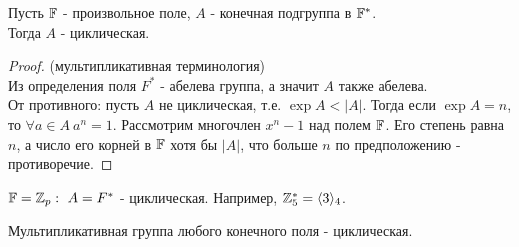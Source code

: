 \begin{theorem}
    Пусть $\mathbb{F}$ - произвольное поле, $A$ - конечная подгруппа в $\mathbb{F}^*$.\\
    Тогда $A$ - циклическая.
\end{theorem}
\begin{proof} (мультипликативная терминология)\\
    Из определения поля $F^*$ - абелева группа, а значит $A$ также абелева.\\
    От противного: пусть $A$ не циклическая, т.е. $\exp A < |A|$. Тогда если $\exp A = n$, то $\forall a \in A \ a^{n} = 1$. Рассмотрим многочлен $x^n - 1$ над полем $\mathbb{F}$. Его степень равна $n$, а число его корней в $\mathbb{F}$ хотя бы $|A|$, что больше $n$ по предположению - противоречие. 
\end{proof}
\begin{example}
    $\mathbb{F} = \mathbb{Z}_p: \ A = F^*$ - циклическая. Например, $\mathbb{Z}_5^* = \langle 3 \rangle_4$. 
\end{example}
\begin{consequense}
    Мультипликативная группа любого конечного поля - циклическая.
\end{consequense}
\newpage